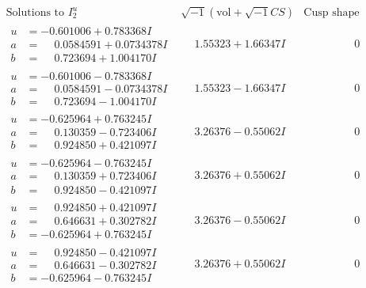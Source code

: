 \documentclass[1p]{elsarticle_modified}
\theoremstyle{definition}
\newcommand{\I}{\sqrt{-1}}
\begin{document}
$$\begin{array}{c|c|c}  
\text{Solutions to }I^u_{2}& \I (\text{vol} + \sqrt{-1}CS) & \text{Cusp shape}\\
 \hline 
\begin{aligned}
u &= -0.601006 + 0.783368 I \\
a &= \phantom{-}0.0584591 + 0.0734378 I \\
b &= \phantom{-}0.723694 + 1.004170 I\end{aligned}
 & \phantom{-}1.55323 + 1.66347 I & \phantom{-0.000000 } 0 \\ \hline\begin{aligned}
u &= -0.601006 - 0.783368 I \\
a &= \phantom{-}0.0584591 - 0.0734378 I \\
b &= \phantom{-}0.723694 - 1.004170 I\end{aligned}
 & \phantom{-}1.55323 - 1.66347 I & \phantom{-0.000000 } 0 \\ \hline\begin{aligned}
u &= -0.625964 + 0.763245 I \\
a &= \phantom{-}0.130359 - 0.723406 I \\
b &= \phantom{-}0.924850 + 0.421097 I\end{aligned}
 & \phantom{-}3.26376 - 0.55062 I & \phantom{-0.000000 } 0 \\ \hline\begin{aligned}
u &= -0.625964 - 0.763245 I \\
a &= \phantom{-}0.130359 + 0.723406 I \\
b &= \phantom{-}0.924850 - 0.421097 I\end{aligned}
 & \phantom{-}3.26376 + 0.55062 I & \phantom{-0.000000 } 0 \\ \hline\begin{aligned}
u &= \phantom{-}0.924850 + 0.421097 I \\
a &= \phantom{-}0.646631 + 0.302782 I \\
b &= -0.625964 + 0.763245 I\end{aligned}
 & \phantom{-}3.26376 - 0.55062 I & \phantom{-0.000000 } 0 \\ \hline\begin{aligned}
u &= \phantom{-}0.924850 - 0.421097 I \\
a &= \phantom{-}0.646631 - 0.302782 I \\
b &= -0.625964 - 0.763245 I\end{aligned}
 & \phantom{-}3.26376 + 0.55062 I & \phantom{-0.000000 } 0 \\ \hline\begin{aligned}

\end{aligned}
\end{array}$$
\end{document}
